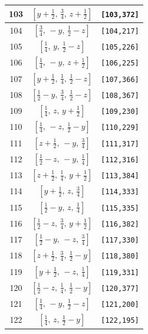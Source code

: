 \documentclass[fleqn,8pt]{jsarticle}
\begin{document}
\begin{longtable}{ccc}
103 & $\left[ y + \frac{1}{2},\, \frac{3}{4},\, z + \frac{1}{2} \right]$ & {\tt [103,372]} \\ \hline
104 & $\left[ \frac{3}{4},\, - y,\, \frac{1}{2} - z \right]$ & {\tt [104,217]} \\ \hline
105 & $\left[ \frac{1}{4},\, y,\, \frac{1}{2} - z \right]$ & {\tt [105,226]} \\ \hline
106 & $\left[ \frac{1}{4},\, - y,\, z + \frac{1}{2} \right]$ & {\tt [106,225]} \\ \hline
107 & $\left[ y + \frac{1}{2},\, \frac{1}{4},\, \frac{1}{2} - z \right]$ & {\tt [107,366]} \\ \hline
108 & $\left[ \frac{1}{2} - y,\, \frac{3}{4},\, \frac{1}{2} - z \right]$ & {\tt [108,367]} \\ \hline
109 & $\left[ \frac{1}{4},\, z,\, y + \frac{1}{2} \right]$ & {\tt [109,230]} \\ \hline
110 & $\left[ \frac{1}{4},\, - z,\, \frac{1}{2} - y \right]$ & {\tt [110,229]} \\ \hline
111 & $\left[ z + \frac{1}{2},\, - y,\, \frac{3}{4} \right]$ & {\tt [111,317]} \\ \hline
112 & $\left[ \frac{1}{2} - z,\, - y,\, \frac{1}{4} \right]$ & {\tt [112,316]} \\ \hline
113 & $\left[ z + \frac{1}{2},\, \frac{1}{4},\, y + \frac{1}{2} \right]$ & {\tt [113,384]} \\ \hline
114 & $\left[ y + \frac{1}{2},\, z,\, \frac{3}{4} \right]$ & {\tt [114,333]} \\ \hline
115 & $\left[ \frac{1}{2} - y,\, z,\, \frac{1}{4} \right]$ & {\tt [115,335]} \\ \hline
116 & $\left[ \frac{1}{2} - z,\, \frac{3}{4},\, y + \frac{1}{2} \right]$ & {\tt [116,382]} \\ \hline
117 & $\left[ \frac{1}{2} - y,\, - z,\, \frac{3}{4} \right]$ & {\tt [117,330]} \\ \hline
118 & $\left[ z + \frac{1}{2},\, \frac{3}{4},\, \frac{1}{2} - y \right]$ & {\tt [118,380]} \\ \hline
119 & $\left[ y + \frac{1}{2},\, - z,\, \frac{1}{4} \right]$ & {\tt [119,331]} \\ \hline
120 & $\left[ \frac{1}{2} - z,\, \frac{1}{4},\, \frac{1}{2} - y \right]$ & {\tt [120,377]} \\ \hline
121 & $\left[ \frac{1}{4},\, - y,\, \frac{1}{2} - z \right]$ & {\tt [121,200]} \\ \hline
122 & $\left[ \frac{1}{4},\, z,\, \frac{1}{2} - y \right]$ & {\tt [122,195]} \\ \hline

\end{longtable}
\end{document}
